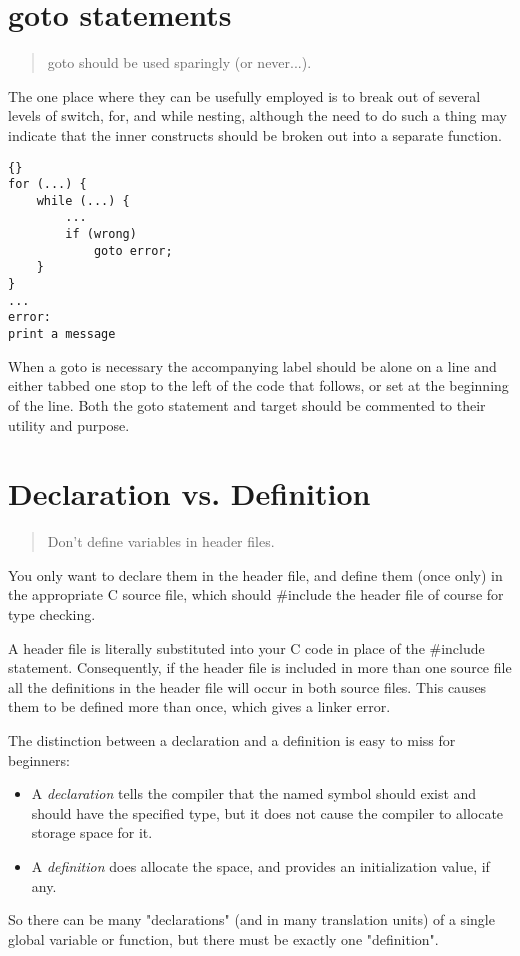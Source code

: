 \documentclass{report}
\begin{document}
\section{goto statements} 
\begin{quote}
goto should be used sparingly (or never...).
\end{quote}
The one place where they can be usefully employed is to break out of several levels of switch, for, and while nesting, although the need to do such a thing may indicate that the inner constructs should be broken out into a separate function. 
\begin{lstlisting}{}
for (...) {
    while (...) {
        ...
        if (wrong)
            goto error;
    }
}
...
error:
print a message
\end{lstlisting}
When a goto is necessary the accompanying label should be alone on a line and either tabbed one stop to the left of the code that follows, or set at the beginning of the line. Both the goto statement and target should be commented to their utility and purpose.

\section{Declaration vs. Definition} 
\begin{quote}
Don't define variables in header files.
\end{quote}
You only want to declare them in the header file, and define them (once only) in the appropriate C source file, which should \#include the header file of course for type checking.

A header file is literally substituted into your C code in place of the \#include statement.
Consequently, if the header file is included in more than one source file all the definitions in the header file will occur in both source files. This causes them to be defined more than once, which gives a linker error. 

The distinction between a declaration and a definition is easy to miss for beginners:
\begin{itemize}
\item A \emph{declaration} tells the compiler that the named symbol should exist and should have the specified type, but it does not cause the compiler to allocate storage space for it.
\item A \emph{definition} does allocate the space, and provides an initialization value, if any.
\end{itemize}
So there can be many "declarations" (and in many translation units) of a single global variable or function, but there must be exactly one "definition".
\end{document}
